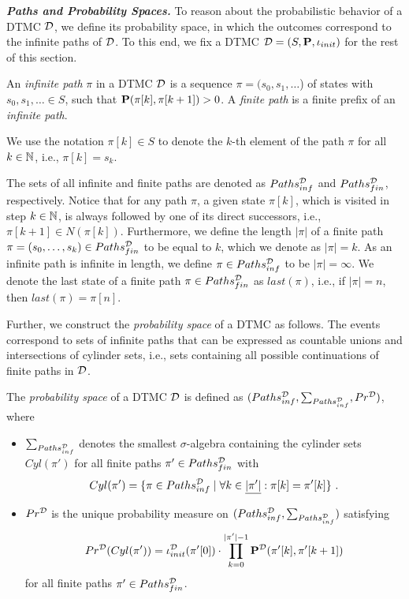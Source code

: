 
\emph{\textbf{Paths and Probability Spaces.}}
To reason about the probabilistic behavior of a DTMC $\mathcal{D}$, we define its probability space, in which the outcomes correspond to the infinite paths of $\mathcal{D}$. To this end, we fix a DTMC $\mathcal{D} = (S,\mathbf{P},\iota_{init})$ for the rest of this section.

\begin{definition}
    An \textit{infinite path} $\pi$ in a DTMC $\mathcal{D}$ is a sequence $\pi = (s_0, s_1, \ldots$) of states with $s_0,s_1,\ldots \in S$, such that $\mathbf{P}(\pi[k],\pi[k+1]) > 0$. A \textit{finite path} is a finite prefix of an \textit{infinite path}.
\end{definition}

We use the notation $\pi[k]\in S$ to denote the $k$-th element of the path $\pi$ for all $k\in \mathbb{N}$, i.e., $\pi[k] = s_k$.

The sets of all infinite and finite paths are denoted as $Paths^{\mathcal{D}}_{inf}$ and $Paths_{fin}^{\mathcal{D}}$, respectively.
Notice that for any path $\pi$, a given state $\pi[k]$, which is visited in step $k\in \mathbb{N}$, is always followed by one of its direct successors, i.e., $\pi[k+1]\in N(\pi[k])$.
Furthermore, we define the length $|\pi|$ of a finite path $\pi = (s_0,\dots,s_k) \in Paths_{fin}^{\mathcal{D}}$ to be equal to $k$, which we denote as $|\pi| = k$. As an infinite path is infinite in length, we define $\pi \in Paths^{\mathcal{D}}_{inf}$ to be $|\pi| = \infty$.
We denote the last state of a finite path $\pi \in Paths^{\mathcal{D}}_{fin}$ as $last(\pi)$, i.e., if $|\pi| = n$, then $last(\pi) = \pi[n]$.

Further, we construct the \textit{probability space} of a DTMC as follows. The events correspond to sets of infinite paths that can be expressed as countable unions and intersections of cylinder sets, i.e., sets containing all possible continuations of finite paths in $\mathcal{D}$.
\begin{definition}\label{def:prob_space_of_DTMC}
    The \textit{probability space} of a DTMC $\mathcal{D}$ is defined as $(Paths_{inf}^{\mathcal{D}}, \sum_{Paths_{inf}^{\mathcal{D}}}, Pr^{\mathcal{D}})$, where
    \begin{itemize}
        \item $\sum_{Paths_{inf}^{\mathcal{D}}}$ denotes the smallest $\sigma$-algebra containing the cylinder sets $Cyl(\pi')$ for all finite paths $\pi'\in Paths_{fin}^{\mathcal{D}}$ with
        \[Cyl(\pi') = \{\pi \in Paths_{inf}^{\mathcal{D}}\mid\forall k\in \underline{|\pi'|}: \pi[k] = \pi'[k]\}\ .\]
        \item $Pr^{\mathcal{D}}$ is the unique probability measure on $(Paths_{inf}^{\mathcal{D}}, \sum_{Paths_{inf}^{\mathcal{D}}})$ satisfying
        \[Pr^{\mathcal{D}}(Cyl(\pi')) = \iota^{\mathcal{D}}_{init}(\pi'[0])\cdot \prod_{k=0}^{|\pi'|-1}\mathbf{P}^{\mathcal{D}}(\pi'[k],\pi'[k+1])\]
        for all finite paths $\pi'\in Paths_{fin}^{\mathcal{D}}$.
    \end{itemize}
\end{definition}

